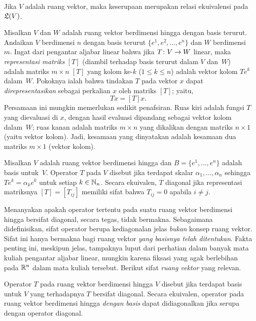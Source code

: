 \begin{prop}\label{sim004thm} Jika $V$ adalah ruang vektor, maka keserupaan merupakan relasi ekuivalensi
pada~$\mathfrak{L}(V)$.
\end{prop}

Misalkan $V$ dan $W$ adalah ruang vektor berdimensi hingga dengan basis terurut. Andaikan $V$ berdimensi $n$ dengan basis terurut
$\{e^1,e^2, \dots,e^n\}$ dan $W$ berdimensi $m$. Ingat dari pengantar aljabar linear bahwa jika $T\colon V \rightarrow W$ linear,
maka
\emph{representasi matriks} $[T]$ (diambil terhadap basis terurut dalam $V$ dan~$W$) adalah matriks $m \times n$ $[T]$
yang kolom ke-$k$ ($1 \le k \le n$) adalah vektor kolom $Te^k$ dalam~$W$. Pokoknya ialah bahwa tindakan $T$ pada
vektor $x$ dapat \emph{direpresentasikan} sebagai perkalian $x$ oleh matriks $[T]$; yaitu,
   \[ Tx = [T]x. \]
Persamaan ini mungkin memerlukan sedikit penafsiran. Ruas kiri adalah fungsi $T$ yang dievaluasi di $x$, dengan
hasil evaluasi dipandang sebagai vektor kolom dalam~$W$; ruas kanan adalah matriks $m \times n$ yang dikalikan
dengan matriks $n \times 1$ (yaitu vektor kolom). Jadi, kesamaan yang dinyatakan adalah kesamaan dua matriks $m \times 1$ (vektor kolom).

\begin{defn} Misalkan $V$ adalah ruang vektor berdimensi hingga dan $B = \{e^1, \dots, e^n\}$ adalah basis untuk~$V$. Operator $T$ pada $V$ disebut
 jika terdapat skalar $\alpha_1, \dots, \alpha_n$ sehingga $Te^k =
\alpha_ke^k$ untuk setiap $k \in \mathbb{N}_n$. Secara ekuivalen, $T$ diagonal jika representasi matriksnya
$[T] = [T_{ij}]$ memiliki sifat bahwa $T_{ij} = 0$ apabila $i \ne j$.
\end{defn}

Menanyakan apakah operator tertentu pada suatu ruang vektor berdimensi hingga bersifat diagonal,
secara tegas, tidak bermakna. Sebagaimana didefinisikan, sifat operator berupa kediagonalan jelas
\emph{bukan} konsep ruang vektor. Sifat ini hanya bermakna bagi ruang vektor
\emph{yang basisnya telah ditentukan}. Fakta penting ini, meskipun jelas, tampaknya
luput dari perhatian dalam banyak mata kuliah pengantar aljabar linear, mungkin karena fiksasi yang agak berlebihan
pada $\mathbb{R}^n$ dalam mata kuliah tersebut. Berikut sifat \emph{ruang vektor} yang relevan.

\begin{defn} Operator $T$ pada ruang vektor berdimensi hingga $V$ disebut
 jika terdapat basis untuk $V$ yang terhadapnya $T$
bersifat diagonal. Secara ekuivalen, operator pada ruang vektor berdimensi hingga \emph{dengan
basis} dapat didiagonalkan jika serupa dengan operator diagonal.
\end{defn}

